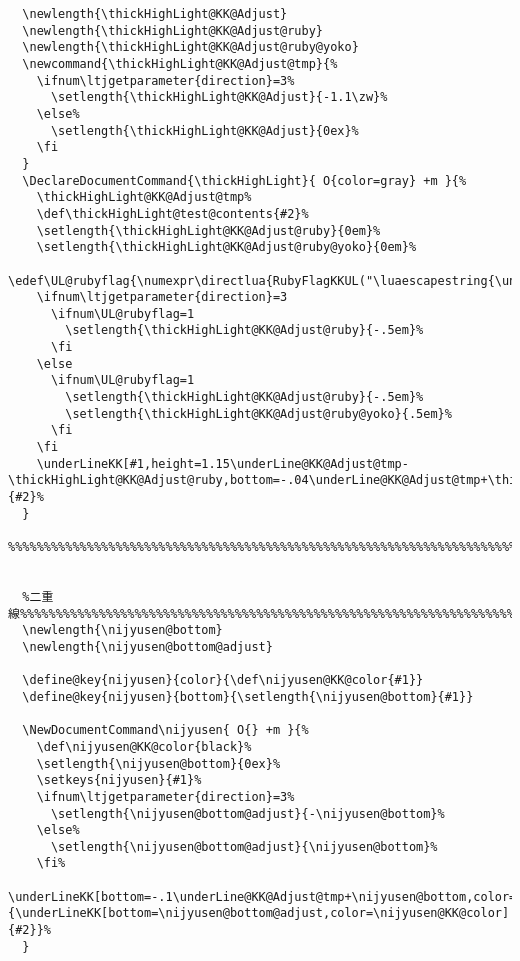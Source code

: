 \documentclass[luatex,fontsize=8pt,paper=b5,twoside]{jlreq}%
\begin{document}
\begin{lstlisting}
  \newlength{\thickHighLight@KK@Adjust}
  \newlength{\thickHighLight@KK@Adjust@ruby}
  \newlength{\thickHighLight@KK@Adjust@ruby@yoko}
  \newcommand{\thickHighLight@KK@Adjust@tmp}{%
    \ifnum\ltjgetparameter{direction}=3%
      \setlength{\thickHighLight@KK@Adjust}{-1.1\zw}%
    \else%
      \setlength{\thickHighLight@KK@Adjust}{0ex}%
    \fi
  }
  \DeclareDocumentCommand{\thickHighLight}{ O{color=gray} +m }{%
    \thickHighLight@KK@Adjust@tmp%
    \def\thickHighLight@test@contents{#2}%
    \setlength{\thickHighLight@KK@Adjust@ruby}{0em}%
    \setlength{\thickHighLight@KK@Adjust@ruby@yoko}{0em}%
    \edef\UL@rubyflag{\numexpr\directlua{RubyFlagKKUL("\luaescapestring{\unexpanded\expandafter{\thickHighLight@test@contents}}")}\relax}%
    \ifnum\ltjgetparameter{direction}=3
      \ifnum\UL@rubyflag=1
        \setlength{\thickHighLight@KK@Adjust@ruby}{-.5em}%
      \fi
    \else
      \ifnum\UL@rubyflag=1
        \setlength{\thickHighLight@KK@Adjust@ruby}{-.5em}%
        \setlength{\thickHighLight@KK@Adjust@ruby@yoko}{.5em}%
      \fi
    \fi
    \underLineKK[#1,height=1.15\underLine@KK@Adjust@tmp-\thickHighLight@KK@Adjust@ruby,bottom=-.04\underLine@KK@Adjust@tmp+\thickHighLight@KK@Adjust+\thickHighLight@KK@Adjust@ruby+\thickHighLight@KK@Adjust@ruby@yoko]{#2}%
  }
  %%%%%%%%%%%%%%%%%%%%%%%%%%%%%%%%%%%%%%%%%%%%%%%%%%%%%%%%%%%%%%%%%%%%%%%%%%%%%%%%%%%%%%%%%


  %二重線%%%%%%%%%%%%%%%%%%%%%%%%%%%%%%%%%%%%%%%%%%%%%%%%%%%%%%%%%%%%%%%%%%%%%%%%%%%%%%%%%%
  \newlength{\nijyusen@bottom}
  \newlength{\nijyusen@bottom@adjust}

  \define@key{nijyusen}{color}{\def\nijyusen@KK@color{#1}}
  \define@key{nijyusen}{bottom}{\setlength{\nijyusen@bottom}{#1}}

  \NewDocumentCommand\nijyusen{ O{} +m }{%
    \def\nijyusen@KK@color{black}%
    \setlength{\nijyusen@bottom}{0ex}%
    \setkeys{nijyusen}{#1}%
    \ifnum\ltjgetparameter{direction}=3%
      \setlength{\nijyusen@bottom@adjust}{-\nijyusen@bottom}%
    \else%
      \setlength{\nijyusen@bottom@adjust}{\nijyusen@bottom}%
    \fi%
    \underLineKK[bottom=-.1\underLine@KK@Adjust@tmp+\nijyusen@bottom,color=\nijyusen@KK@color]{\underLineKK[bottom=\nijyusen@bottom@adjust,color=\nijyusen@KK@color]{#2}}%
  }



\end{lstlisting}
\end{document}
